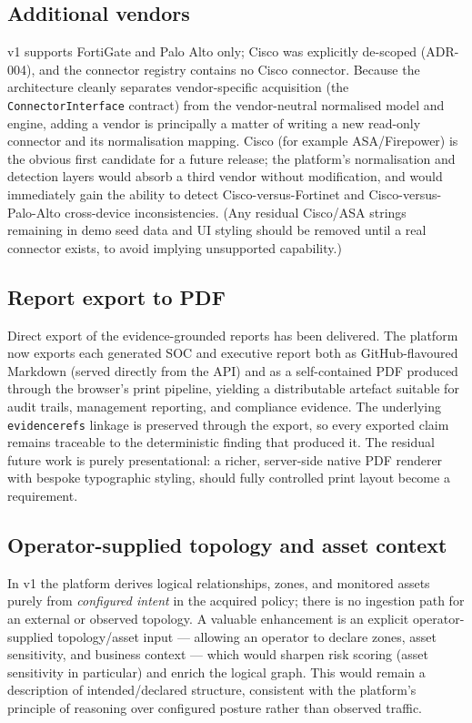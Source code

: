 \documentclass[12pt,a4paper]{report}
\renewcommand{\_}{\textunderscore\allowbreak}
\begin{document}
\subsection{Additional vendors}
\label{sec:ch5-vendors}

v1 supports FortiGate and Palo Alto only; Cisco was explicitly de-scoped (ADR-004), and the connector registry contains no Cisco connector. Because the architecture cleanly separates vendor-specific acquisition (the \texttt{ConnectorInterface} contract) from the vendor-neutral normalised model and engine, adding a vendor is principally a matter of writing a new read-only connector and its normalisation mapping. Cisco (for example ASA/Firepower) is the obvious first candidate for a future release; the platform's normalisation and detection layers would absorb a third vendor without modification, and would immediately gain the ability to detect Cisco-versus-Fortinet and Cisco-versus-Palo-Alto cross-device inconsistencies. (Any residual Cisco/ASA strings remaining in demo seed data and UI styling should be removed until a real connector exists, to avoid implying unsupported capability.)

\subsection{Report export to PDF}
\label{sec:ch5-pdf}

Direct export of the evidence-grounded reports has been delivered. The platform now exports each generated SOC and executive report both as GitHub-flavoured Markdown (served directly from the API) and as a self-contained PDF produced through the browser's print pipeline, yielding a distributable artefact suitable for audit trails, management reporting, and compliance evidence. The underlying \texttt{evidence\_refs} linkage is preserved through the export, so every exported claim remains traceable to the deterministic finding that produced it. The residual future work is purely presentational: a richer, server-side native PDF renderer with bespoke typographic styling, should fully controlled print layout become a requirement.

\subsection{Operator-supplied topology and asset context}
\label{sec:ch5-topology-input}

In v1 the platform derives logical relationships, zones, and monitored assets purely from \emph{configured intent} in the acquired policy; there is no ingestion path for an external or observed topology. A valuable enhancement is an explicit operator-supplied topology/asset input --- allowing an operator to declare zones, asset sensitivity, and business context --- which would sharpen risk scoring (asset sensitivity in particular) and enrich the logical graph. This would remain a description of intended/declared structure, consistent with the platform's principle of reasoning over configured posture rather than observed traffic.
\end{document}
